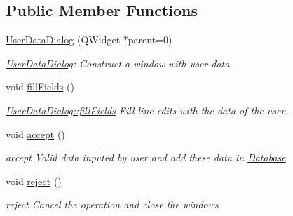 \subsection*{Public Member Functions}
\begin{DoxyCompactItemize}
\item 
\hyperlink{classGui_1_1Dialogs_1_1UserDataDialog_a3cafa419d49d124e72511a3b91f8ee76}{User\+Data\+Dialog} (Q\+Widget $\ast$parent=0)
\begin{DoxyCompactList}\small\item\em \hyperlink{classGui_1_1Dialogs_1_1UserDataDialog}{User\+Data\+Dialog}\+: Construct a window with user data. \end{DoxyCompactList}\item 
\hypertarget{classGui_1_1Dialogs_1_1UserDataDialog_ae1a17e6547a30b03ba2c837ba0b28455}{void \hyperlink{classGui_1_1Dialogs_1_1UserDataDialog_ae1a17e6547a30b03ba2c837ba0b28455}{fill\+Fields} ()}\label{classGui_1_1Dialogs_1_1UserDataDialog_ae1a17e6547a30b03ba2c837ba0b28455}

\begin{DoxyCompactList}\small\item\em \hyperlink{classGui_1_1Dialogs_1_1UserDataDialog_ae1a17e6547a30b03ba2c837ba0b28455}{User\+Data\+Dialog\+::fill\+Fields} Fill line edits with the data of the user. \end{DoxyCompactList}\item 
\hypertarget{classGui_1_1Dialogs_1_1UserDataDialog_a2d3841c471d0ddfd58610d3667d8521a}{void \hyperlink{classGui_1_1Dialogs_1_1UserDataDialog_a2d3841c471d0ddfd58610d3667d8521a}{accept} ()}\label{classGui_1_1Dialogs_1_1UserDataDialog_a2d3841c471d0ddfd58610d3667d8521a}

\begin{DoxyCompactList}\small\item\em accept Valid data inputed by user and add these data in \hyperlink{namespaceDatabase}{Database} \end{DoxyCompactList}\item 
\hypertarget{classGui_1_1Dialogs_1_1UserDataDialog_a919f59546670019bb4e72fcd0c7ea841}{void \hyperlink{classGui_1_1Dialogs_1_1UserDataDialog_a919f59546670019bb4e72fcd0c7ea841}{reject} ()}\label{classGui_1_1Dialogs_1_1UserDataDialog_a919f59546670019bb4e72fcd0c7ea841}

\begin{DoxyCompactList}\small\item\em reject Cancel the operation and close the windows \end{DoxyCompactList}\end{DoxyCompactItemize}


